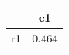 \begin{table}[htbp]
\begin{tabular}{lc} \hline \hline
 & c1  \\  \hline 
r1 &     0.464 \\  
\hline \hline \end{tabular}
\end{table}
